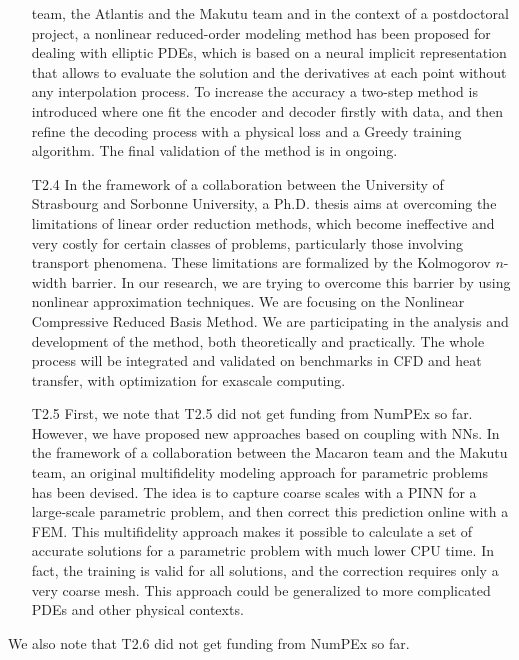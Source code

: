 \begin{itemize}
  team, the Atlantis and  the Makutu team and  in the context of a  postdoctoral project, a  nonlinear reduced-order  modeling method has  been proposed
  for dealing with elliptic PDEs, which  is based on a neural implicit
  representation  that  allows  to   evaluate  the  solution  and  the
  derivatives  at each  point without  any interpolation  process.  To
  increase the accuracy a two-step  method is introduced where one fit
  the  encoder and  decoder firstly  with  data, and  then refine  the
  decoding  process  with  a  physical  loss  and  a  Greedy  training
  algorithm. The final validation of the method is in ongoing.
\item[T2.4] In the framework of a collaboration between the University
  of  Strasbourg  and
  Sorbonne University, a Ph.D. thesis aims  at  overcoming  the  limitations  of  linear  order  reduction
  methods,  which  become  ineffective  and very  costly  for  certain
  classes   of  problems,   particularly  those   involving  transport
  phenomena.   These  limitations  are formalized  by  the  Kolmogorov
  $n$-width barrier.  In our research,  we are trying to overcome this
  barrier  by  using  nonlinear   approximation  techniques.   We  are
  focusing on the Nonlinear Compressive  Reduced Basis Method.  We are
  participating in  the analysis and  development of the  method, both
  theoretically and practically. The  whole process will be integrated
  and  validated  on  benchmarks  in   CFD  and  heat  transfer,  with
  optimization for exascale computing.
\item[T2.5] First, we  note that T2.5 did not get  funding from NumPEx
  so far. However,  we have proposed new approaches  based on coupling
  with NNs.  In  the framework of a collaboration  between the Macaron
  team and the Makutu  team,  an original multifidelity  modeling approach  for parametric  problems has  been
  devised.  The  idea is to  capture coarse scales  with a PINN  for a
  large-scale  parametric problem,  and then  correct this  prediction
  online with a FEM.  This multifidelity approach makes it possible to
  calculate a set of accurate  solutions for a parametric problem with
  much  lower CPU  time.   In  fact, the  training  is  valid for  all
  solutions, and the correction requires only a very coarse mesh. This
  approach could  be generalized  to more  complicated PDEs  and other
  physical contexts.
\end{itemize}

We also note that T2.6  did not get funding from NumPEx so far.

